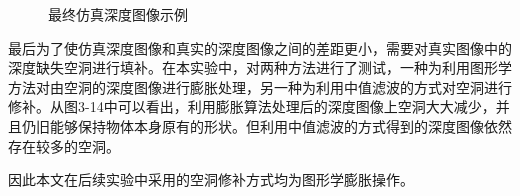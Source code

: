\begin{figure}[htb]
{%
}
\hspace{0.01\linewidth}
\caption{最终仿真深度图像示例}
\end{figure}

最后为了使仿真深度图像和真实的深度图像之间的差距更小，需要对真实图像中的深度缺失空洞进行填补。在本实验中，对两种方法进行了测试，一种为利用图形学方法对由空洞的深度图像进行膨胀处理，另一种为利用中值滤波的方式对空洞进行修补。从图3-14中可以看出，利用膨胀算法处理后的深度图像上空洞大大减少，并且仍旧能够保持物体本身原有的形状。但利用中值滤波的方式得到的深度图像依然存在较多的空洞。

因此本文在后续实验中采用的空洞修补方式均为图形学膨胀操作。


